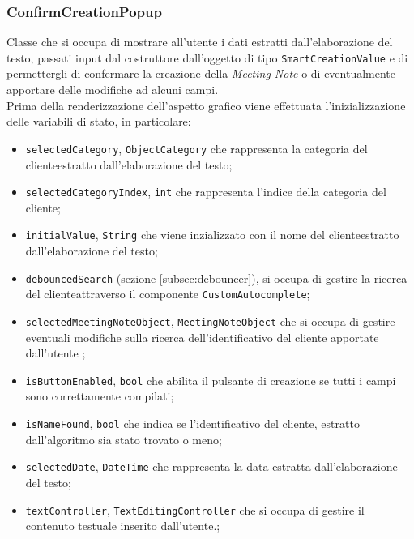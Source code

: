 \subsubsection*{ConfirmCreationPopup}
\label{subsubsec:confirm-creation-popup}

Classe che si occupa di mostrare all'utente i dati estratti dall'elaborazione del testo, passati input dal costruttore dall'oggetto di tipo \lstinline{SmartCreationValue} e di permettergli di confermare la creazione della \emph{Meeting Note} o di eventualmente apportare delle modifiche ad alcuni campi. \\
Prima della renderizzazione dell'aspetto grafico viene effettuata l'inizializzazione delle variabili di stato, in particolare:
\begin{itemize}
    \item \lstinline{selectedCategory}, \lstinline{ObjectCategory} che rappresenta la categoria del \gls{cliente}\glsoccur estratto dall'elaborazione del testo;
    \item \lstinline{selectedCategoryIndex}, \lstinline{int} che rappresenta l'indice della categoria del \gls{cliente}\glsoccur;
    \item \lstinline{initialValue}, \lstinline{String} che viene inzializzato con il nome del \gls{cliente}\glsoccur estratto dall'elaborazione del testo;
    \item \lstinline{debouncedSearch} (sezione \ref{subsec:debouncer}), si occupa di gestire la ricerca del \gls{cliente}\glsoccur attraverso il componente \lstinline{CustomAutocomplete};
    \item \lstinline{selectedMeetingNoteObject}, \lstinline{MeetingNoteObject} che si occupa di gestire eventuali modifiche sulla ricerca dell'identificativo del cliente apportate dall'utente ;
    \item \lstinline{isButtonEnabled}, \lstinline{bool} che abilita il pulsante di creazione se tutti i campi sono correttamente compilati;
    \item \lstinline{isNameFound}, \lstinline{bool} che indica se l'identificativo del \gls{cliente}\glsoccur, estratto dall'algoritmo sia stato trovato o meno;
    \item \lstinline{selectedDate}, \lstinline{DateTime} che rappresenta la data estratta dall'elaborazione del testo;
    \item \lstinline{textController}, \lstinline{TextEditingController} che si occupa di gestire il contenuto testuale inserito dall'utente.;
\end{itemize}
